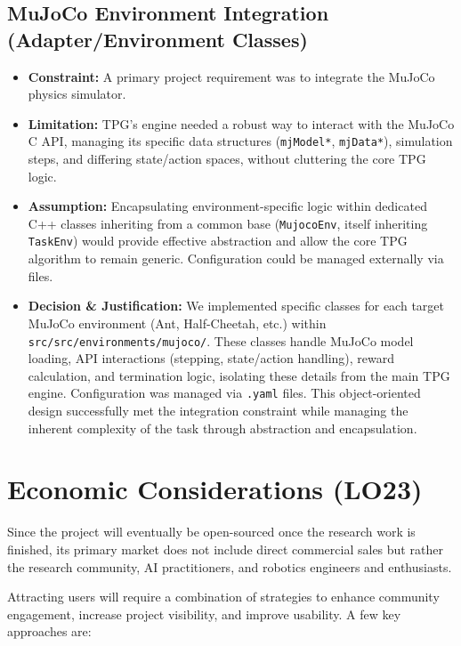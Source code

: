 \documentclass{article}
\begin{document}
\subsection{MuJoCo Environment Integration (Adapter/Environment Classes)}
\begin{itemize}
    \item \textbf{Constraint:} A primary project requirement was to integrate the MuJoCo physics simulator.
    \item \textbf{Limitation:} TPG's engine needed a robust way to interact with the MuJoCo C API, managing its specific data structures (\texttt{mjModel*}, \texttt{mjData*}), simulation steps, and differing state/action spaces, without cluttering the core TPG logic.
    \item \textbf{Assumption:} Encapsulating environment-specific logic within dedicated C++ classes inheriting from a common base (\texttt{MujocoEnv}, itself inheriting \texttt{TaskEnv}) would provide effective abstraction and allow the core TPG algorithm to remain generic. Configuration could be managed externally via files.
    \item \textbf{Decision \& Justification:} We implemented specific classes for each target MuJoCo environment (Ant, Half-Cheetah, etc.) within \texttt{src/src/environments/mujoco/}. These classes handle MuJoCo model loading, API interactions (stepping, state/action handling), reward calculation, and termination logic, isolating these details from the main TPG engine. Configuration was managed via \texttt{.yaml} files. This object-oriented design successfully met the integration constraint while managing the inherent complexity of the task through abstraction and encapsulation.
\end{itemize}

\section{Economic Considerations (LO23)}

Since the project will eventually be open-sourced once the research work is finished, its primary market does
not include direct commercial sales but rather the research community, AI practitioners, and robotics engineers 
and enthusiasts. 

Attracting users will require a combination of strategies to enhance community engagement,
increase project visibility, and improve usability. A few key approaches are:
\end{document}

